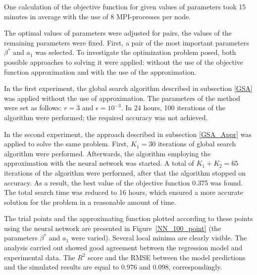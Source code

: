 \documentclass[mathematics,article,submit,pdftex,moreauthors]{Definitions/mdpi}
\begin{document}
One calculation of the objective function for given values of parameters took 15 minutes in average with the use of 8 MPI-processes per node. 

The optimal values of parameters were adjusted for pairs, the values of the remaining parameters were fixed. 
First, a pair of the most important parameters $\beta^*$ and $a_1$ was selected. 
To investigate the optimization problem posed, both possible approaches to solving it were applied: without the use of the objective function approximation  and with the use of the approximation.

In the first experiment, the global search algorithm described in subsection \ref{GSA} was applied without the use of approximation. 
The parameters of the method were set as follows: $r = 3$ and $\epsilon = 10^{-3}$. 
In 24 hours, 100 iterations of the algorithm were performed; the required accuracy was not achieved. 

In the second experiment, the approach described in subsection \ref{GSA_Appr} was applied to solve the same problem.
First, $K_1 = 30$ iterations of global search algorithm were performed. 
Afterwards, the algorithm employing the approximation with the neural network was started. 
A total of $K_1 + K_2 = 65$ iterations of the algorithm were performed, after that the algorithm stopped on accuracy. 
As a result, the best value  of the objective function 0.375 was found. 
The total search time was reduced to 16 hours, which ensured a more accurate solution for the problem in a reasonable amount of time.

The trial points and the approximating function plotted according to these points using the neural network are presented in Figure~\ref{NN_100_point} (the parameters $\beta^*$ and $a_1$ were varied). Several local minima are clearly visible.
The analysis carried out showed good agreement between the regression model and experimental data.
The $R^2$ score and the RMSE between the model predictions and the simulated results are equal to 0.976 and 0.098, correspondingly.
\end{document}
